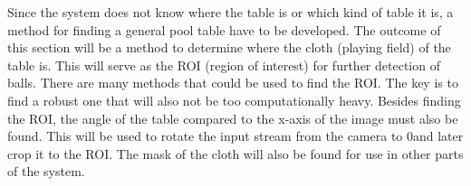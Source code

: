 Since the system does not know where the table is or which kind of table it is, a method for finding a general pool table have to be developed. The outcome of this section will be a method to determine where the cloth (playing field) of the table is. This will serve as the ROI (region of interest) for further detection of balls. There are many methods that could be used to find the ROI. The key is to find a robust one that will also not be too computationally heavy. Besides finding the ROI, the angle of the table compared to the x-axis of the image must also be found. This will be used to rotate the input stream from the camera to 0\degree and later crop it to the ROI. The mask of the cloth will also be found for use in other parts of the system.\\
